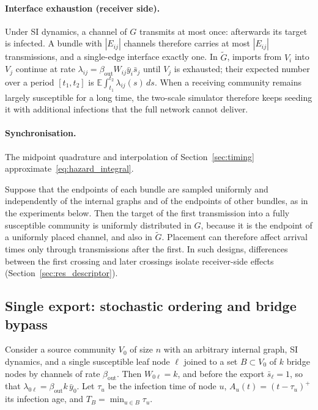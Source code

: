 \documentclass[a4paper,fleqn]{cas-sc}
\newcommand{\ibar}{\bar{y}}
\newcommand{\sbar}{\bar{s}}
\begin{document}
\paragraph{Interface exhaustion (receiver side).}
Under SI dynamics, a channel of $G$ transmits at most once: afterwards its target is infected. A bundle with $|E_{ij}|$ channels therefore carries at most $|E_{ij}|$ transmissions, and a single-edge interface exactly one. In $\tilde G$, imports from $V_i$ into $V_j$ continue at rate $\lambda_{ij}=\beta_{\mathrm{out}}W_{ij}\ibar_i\sbar_j$ until $V_j$ is exhausted; their expected number over a period $[t_1,t_2]$ is $\mathbb{E}\int_{t_1}^{t_2}\lambda_{ij}(s)\,ds$. When a receiving community remains largely susceptible for a long time, the two-scale simulator therefore keeps seeding it with additional infections that the full network cannot deliver.

\paragraph{Synchronisation.}
The midpoint quadrature and interpolation of Section~\ref{sec:timing} approximate~\eqref{eq:hazard_integral}.

\begin{remark}
\label{rem:placement}
Suppose that the endpoints of each bundle are sampled uniformly and independently of the internal graphs and of the endpoints of other bundles, as in the experiments below. Then the target of the first transmission into a fully susceptible community is uniformly distributed in $G$, because it is the endpoint of a uniformly placed channel, and also in $\tilde G$. Placement can therefore affect arrival times only through transmissions after the first. In such designs, differences between the first crossing and later crossings isolate receiver-side effects (Section~\ref{sec:res_descriptor}).
\end{remark}

\subsection{Single export: stochastic ordering and bridge bypass}
\label{sec:single_export}

Consider a source community $V_0$ of size $n$ with an arbitrary internal graph, SI dynamics, and a single susceptible leaf node $\ell$ joined to a set $B\subset V_0$ of $k$ bridge nodes by channels of rate $\beta_{\mathrm{out}}$. Then $W_{0\ell}=k$, and before the export $\sbar_\ell=1$, so that $\lambda_{0\ell}=\beta_{\mathrm{out}}k\,\ibar_0$. Let $\tau_u$ be the infection time of node $u$, $A_u(t)=(t-\tau_u)^+$ its infection age, and $T_B=\min_{u\in B}\tau_u$.
\end{document}
